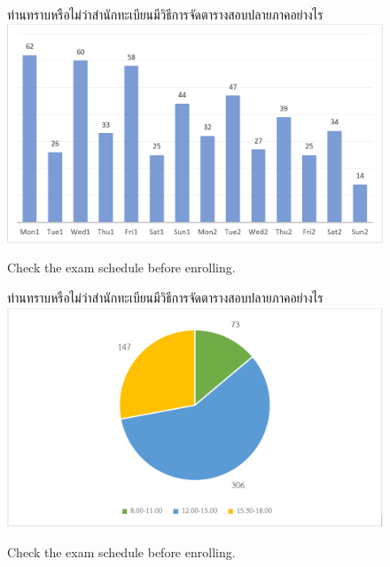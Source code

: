 \begin{figure}
\begin{center}
ท่านทราบหรือไม่ว่าสำนักทะเบียนมีวิธีการจัดตารางสอบปลายภาคอย่างไร
\includegraphics[width=\linewidth]{chart.png}
\end{center}
\caption[Poem]{Check the exam schedule before enrolling.}
\label{fig:enroll}     
\end{figure}
\begin{figure}
\begin{center}
ท่านทราบหรือไม่ว่าสำนักทะเบียนมีวิธีการจัดตารางสอบปลายภาคอย่างไร
\includegraphics[width=\linewidth]{pie.png}
\end{center}
\caption[Poem]{Check the exam schedule before enrolling.}
\label{fig:enroll}     
\end{figure}
